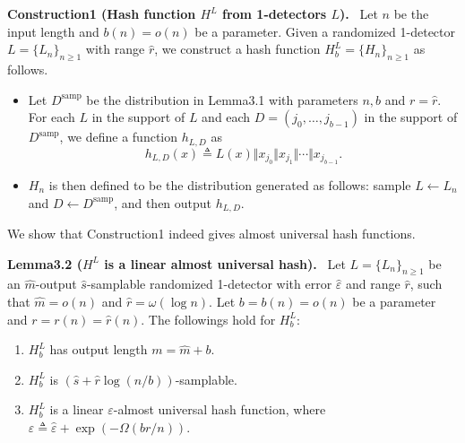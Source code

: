 \documentclass[10pt,a4paper]{article}
\newenvironment{authorclaim}[1]{\par\medskip\noindent\textbf{#1.}\ }{\par\medskip}
\begin{document}
\begin{authorclaim}{Construction1 (Hash function $H^L$ from 1-detectors $L$)}
Let $n$ be the input length and $b(n)=o(n)$ be a parameter. Given a randomized 1-detector $L=\{L_n\}_{n\ge1}$ with range $\hat r$, we construct a hash function $H_b^L=\{H_n\}_{n\ge1}$ as follows.
\begin{itemize}
\item Let $D^{\mathrm{samp}}$ be the distribution in Lemma3.1 with parameters $n,b$ and $r=\hat r$. For each $L$ in the support of $L$ and each $D=(j_0,\ldots,j_{b-1})$ in the support of $D^{\mathrm{samp}}$, we define a function $h_{L,D}$ as
\[h_{L,D}(x)\triangleq L(x)\Vert x_{j_0}\Vert x_{j_1}\Vert\cdots\Vert x_{j_{b-1}}.\]
\item $H_n$ is then defined to be the distribution generated as follows: sample $L\leftarrow L_n$ and $D\leftarrow D^{\mathrm{samp}}$, and then output $h_{L,D}$.
\end{itemize}
\end{authorclaim}
We show that Construction1 indeed gives almost universal hash functions.
\begin{authorclaim}{Lemma3.2 ($H^L$ is a linear almost universal hash)}
Let $L=\{L_n\}_{n\ge1}$ be an $\hat m$-output $\hat s$-samplable randomized 1-detector with error $\hat\varepsilon$ and range $\hat r$, such that $\hat m=o(n)$ and $\hat r=\omega(\log n)$. Let $b=b(n)=o(n)$ be a parameter and $r=r(n)=\hat r(n)$. The followings hold for $H_b^L$:
\begin{enumerate}
\item $H_b^L$ has output length $m=\hat m+b$.
\item $H_b^L$ is $(\hat s+\hat r\log(n/b))$-samplable.
\item $H_b^L$ is a linear $\varepsilon$-almost universal hash function, where $\varepsilon\triangleq\hat\varepsilon+\exp(-\Omega(br/n))$.
\end{enumerate}
\end{authorclaim}
\end{document}
